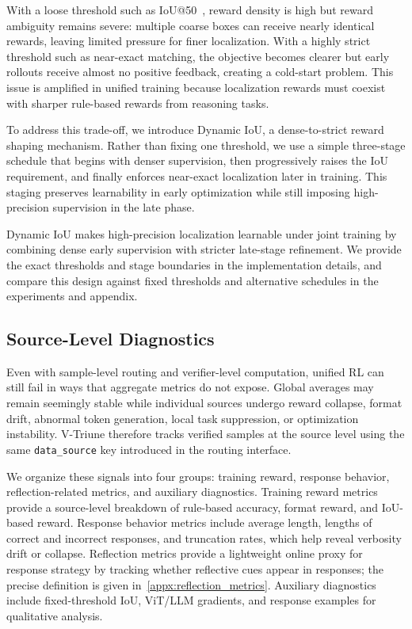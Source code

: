 With a loose threshold such as IoU@50~\citep{yu2025perception}, reward density is high but reward ambiguity remains severe: multiple coarse boxes can receive nearly identical rewards, leaving limited pressure for finer localization.
%
With a highly strict threshold such as near-exact matching, the objective becomes clearer but early rollouts receive almost no positive feedback, creating a cold-start problem.
%
This issue is amplified in unified training because localization rewards must coexist with sharper rule-based rewards from reasoning tasks.

To address this trade-off, we introduce Dynamic IoU, a dense-to-strict reward shaping mechanism.
%
Rather than fixing one threshold, we use a simple three-stage schedule that begins with denser supervision, then progressively raises the IoU requirement, and finally enforces near-exact localization later in training.
%
This staging preserves learnability in early optimization while still imposing high-precision supervision in the late phase.

Dynamic IoU makes high-precision localization learnable under joint training by combining dense early supervision with stricter late-stage refinement.
%
We provide the exact thresholds and stage boundaries in the implementation details, and compare this design against fixed thresholds and alternative schedules in the experiments and appendix.
%
\subsection{Source-Level Diagnostics}
\label{subsec:metric_monitoring}

Even with sample-level routing and verifier-level computation, unified RL can still fail in ways that aggregate metrics do not expose.
%
Global averages may remain seemingly stable while individual sources undergo reward collapse, format drift, abnormal token generation, local task suppression, or optimization instability.
%
V-Triune therefore tracks verified samples at the source level using the same \texttt{data\_source} key introduced in the routing interface.

We organize these signals into four groups: training reward, response behavior, reflection-related metrics, and auxiliary diagnostics.
%
Training reward metrics provide a source-level breakdown of rule-based accuracy, format reward, and IoU-based reward.
%
Response behavior metrics include average length, lengths of correct and incorrect responses, and truncation rates, which help reveal verbosity drift or collapse.
%
Reflection metrics provide a lightweight online proxy for response strategy by tracking whether reflective cues appear in responses; the precise definition is given in~\cref{appx:reflection_metrics}.
%
Auxiliary diagnostics include fixed-threshold IoU, ViT/LLM gradients, and response examples for qualitative analysis.

